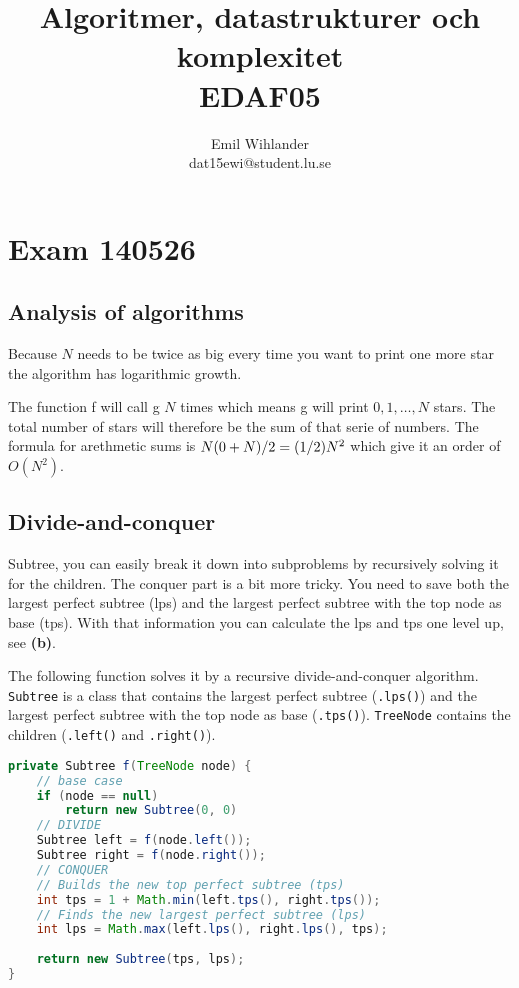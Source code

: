 \documentclass[a4paper]{article}
\title{Algoritmer, datastrukturer och komplexitet\\ EDAF05}
\author{Emil Wihlander\\ dat15ewi@student.lu.se}
\newenvironment{task}[1]
{
	\begin{description}[align=right]
		\item [#1]
}{		%
	\end{description}
}
\newcommand{\taskref}[1]{\textbf{#1}}
\let\*\relax
\DeclareMathOperator{\*}{\cdot}
\begin{document}
 
\maketitle

\section*{Exam 140526}
\subsection*{Analysis of algorithms}

\begin{task}{1. (a)}
	 Because $N$ needs to be twice as big every time you want to print one more star the algorithm has logarithmic growth.
\end{task}

\begin{task}{(b)}
	 The function f will call g $N$ times which means g will print $0, 1, \ldots, N$ stars. The total number of stars will therefore be the sum of that serie of numbers. The formula for arethmetic sums is $N\*(0+N)/2=(1/2)\*N^2$ which give it an order of $O(N^2)$.
\end{task}

\subsection*{Divide-and-conquer}

\begin{task}{2. (a)}
	 Subtree, you can easily break it down into subproblems by recursively solving it for the children. The conquer part is a bit more tricky. You need to save both the largest perfect subtree (lps) and the largest perfect subtree with the top node as base (tps). With that information you can calculate the lps and tps one level up, see \taskref{(b)}. 
\end{task}

\begin{task}{(b)}
	\qquad The following function solves it by a recursive divide-and-conquer algorithm. \texttt{Subtree} is a class that contains the largest perfect subtree (\texttt{.lps()}) and the largest perfect subtree with the top node as base (\texttt{.tps()}). \texttt{TreeNode} contains the children (\texttt{.left()} and \texttt{.right()}).
\begin{lstlisting}[language=Java]
private Subtree f(TreeNode node) {
	// base case
	if (node == null) 
		return new Subtree(0, 0)
	// DIVIDE
	Subtree left = f(node.left());
	Subtree right = f(node.right());
	// CONQUER
	// Builds the new top perfect subtree (tps)
	int tps = 1 + Math.min(left.tps(), right.tps());
	// Finds the new largest perfect subtree (lps)
	int lps = Math.max(left.lps(), right.lps(), tps);
	
	return new Subtree(tps, lps);
}
\end{lstlisting}
\end{task}
\end{document}
